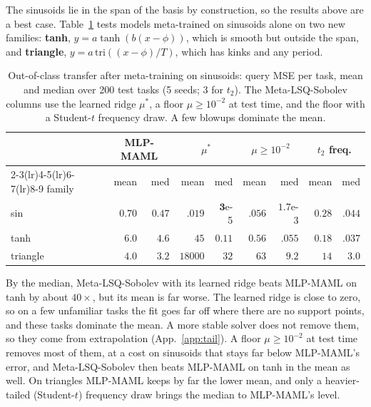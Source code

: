 \documentclass[fullpaper,final]{nldl}
\theoremstyle{plain}
\theoremstyle{definition}
\begin{document}
The sinusoids lie in the span of the basis by construction, so the results above
are a best case. Table~\ref{tab:ooc} tests models meta-trained on sinusoids alone on
two new families: \textbf{tanh}, $y = a\tanh(b(x-\phi))$, which is smooth but
outside the span, and \textbf{triangle}, $y = a\,\mathrm{tri}((x-\phi)/T)$, which
has kinks and any period.

\begin{table}[tb]
\centering
\caption{Out-of-class transfer after meta-training on sinusoids: query MSE per
task, mean and median over 200 test tasks (5 seeds; 3 for $t_2$). The Meta-LSQ-Sobolev
columns use the learned ridge $\mu^\ast$, a floor $\mu\geq10^{-2}$ at test time, and
the floor with a Student-$t$ frequency draw. A few blowups dominate the mean.}
\label{tab:ooc}
\footnotesize
\setlength{\tabcolsep}{1.75pt}
\begin{tabular}{lrrrrrrrr}
\toprule
& \multicolumn{2}{c}{MLP-MAML}
& \multicolumn{2}{c}{$\mu^\ast$}
& \multicolumn{2}{c}{$\mu\!\geq\!10^{-2}$}
& \multicolumn{2}{c}{$t_2$ freq.} \\
\cmidrule(lr){2-3}\cmidrule(lr){4-5}\cmidrule(lr){6-7}\cmidrule(lr){8-9}
family & mean & med & mean & med & mean & med & mean & med \\
\midrule
sin      & $0.70$ & $0.47$ & $\mathbf{.019}$ & $\mathbf{3}$e-5 & $.056$ & $1.7$e-3 & $0.28$ & $.044$ \\
tanh     & $6.0$ & $4.6$ & $45$ & $0.11$ & $0.56$ & $.055$ & $\mathbf{0.18}$ & $\mathbf{.037}$ \\
triangle & $\mathbf{4.0}$ & $3.2$ & $18000$ & $32$ & $63$ & $9.2$ & $14$ & $\mathbf{3.0}$ \\
\bottomrule
\end{tabular}
\end{table}

By the median, Meta-LSQ-Sobolev with its learned ridge beats MLP-MAML on tanh by
about $40\times$, but its mean is far worse. The learned ridge is close to zero, so
on a few unfamiliar tasks the fit goes far off where there are no support points,
and these tasks dominate the mean. A more stable solver does not remove
them, so they come from extrapolation (App.~\ref{app:tail}). A
floor $\mu \geq 10^{-2}$ at test time removes most of them, at a cost on sinusoids
that stays far below MLP-MAML's error, and Meta-LSQ-Sobolev then beats MLP-MAML on tanh in the mean as well.
On triangles MLP-MAML keeps by far the lower mean, and only a
heavier-tailed (Student-$t$) frequency draw brings the median to MLP-MAML's level.
\end{document}
